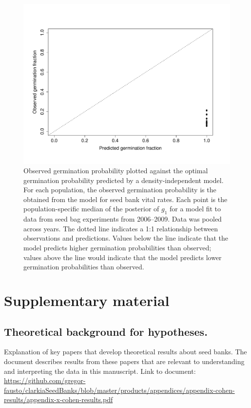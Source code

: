 \documentclass[12pt, oneside, titlepage]{article}   	%
\begin{document}
 

 
 \begin{figure}[h]
   \centering
       \includegraphics[page=1,width=.9\textwidth]{../figures/obs_pred_germ.pdf}  
    \caption{ Observed germination probability plotted against the optimal germination probability predicted by a density-independent model. For each population, the observed germination probability is the obtained from the model for seed bank vital rates. Each point is the population-specific median of the posterior of $g_1$ for a model fit to data from seed bag experiments from 2006--2009. Data was pooled across years. The dotted line indicates a 1:1 relationship between observations and predictions. Values below the line indicate that the model predicts higher germination probabilities than observed; values above the line would indicate that the model predicts lower germination probabilities than observed. }
 \label{fig:obs_pred}
\end{figure}
\fi

\clearpage

 


\clearpage
\section*{Supplementary material}

\subsection*{Theoretical background for hypotheses.} Explanation of key papers that develop theoretical results about seed banks. The document describes results from these papers that are relevant to understanding and interpreting the data in this manuscript. Link to document: \url{https://github.com/gregor-fausto/clarkiaSeedBanks/blob/master/products/appendices/appendix-cohen-results/appendix-x-cohen-results.pdf}
\end{document}

